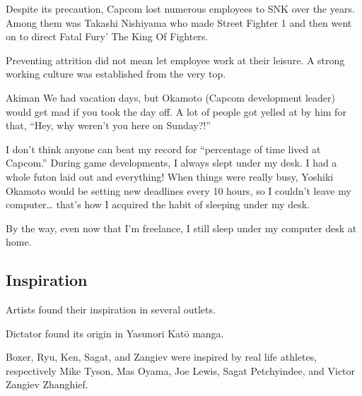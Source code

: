 Despite its precaution, Capcom lost numerous employees to SNK over the years. Among them was Takashi Nishiyama who made Street Fighter 1 and then went on to direct Fatal Fury' The King Of Fighters\cite{YoshikiOkamotoTakashiNishiyama}.
 




Preventing attrition did not mean let employee work at their leisure. A strong working culture was established from the very top.

\begin{q}{Akiman\cite{akiman2003}}
  We had vacation days, but Okamoto (Capcom development leader) would get mad if you took the day off. A lot of people got yelled at by him for that, “Hey, why weren’t you here on Sunday?!”

  I don’t think anyone can beat my record for “percentage of time lived at Capcom.” During game developments, I always slept under my desk. I had a whole futon laid out and everything! When things were really busy, Yoshiki Okamoto  would be setting new deadlines every 10 hours, so I couldn’t leave my computer… that’s how I acquired the habit of sleeping under my desk. 

  By the way, even now that I’m freelance, I still sleep under my computer desk at home.
  \end{q}











\subsection{Inspiration}
Artists found their inspiration in several outlets.

Dictator found its origin in Yasunori Katō manga. 

Boxer, Ryu, Ken, Sagat, and Zangiev were inspired by real life athletes, respectively Mike Tyson, Mas Oyama, Joe Lewis, Sagat Petchyindee, and Victor Zangiev Zhanghief. 

